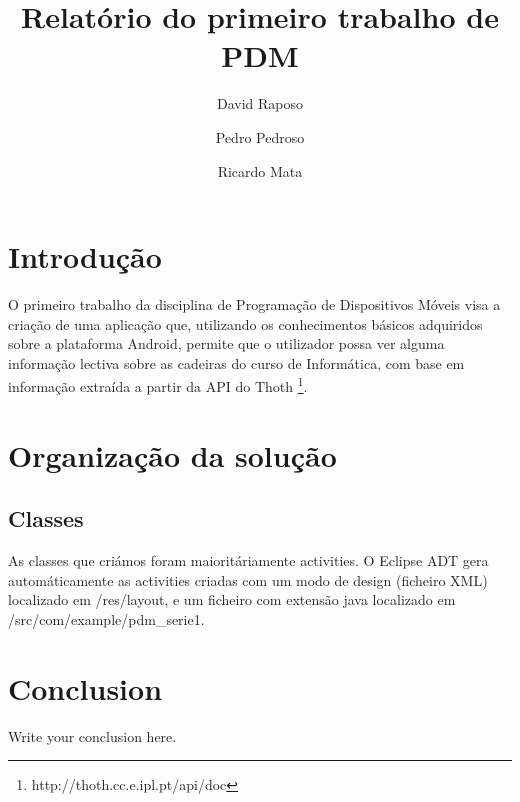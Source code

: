 \documentclass{article}
\begin{document}
\title{Relatório do primeiro trabalho de PDM}
\author{David Raposo \and Pedro Pedroso \and Ricardo Mata}

\maketitle

\section{Introdução}
O primeiro trabalho da disciplina de Programação de Dispositivos Móveis visa a criação de uma aplicação que, utilizando os conhecimentos básicos
adquiridos sobre a plataforma Android, permite que o utilizador possa ver alguma informação lectiva sobre as cadeiras do curso de Informática, com base em
informação extraída a partir da API do Thoth \footnote{http://thoth.cc.e.ipl.pt/api/doc}.

\section{Organização da solução}
\subsection{Classes}
As classes que criámos foram maioritáriamente activities. O Eclipse ADT gera automáticamente as activities criadas com um modo de design (ficheiro XML)
localizado em /res/layout, e um ficheiro com extensão java localizado em /src/com/example/pdm\_serie1.

\section{Conclusion}
Write your conclusion here.
\end{document}
